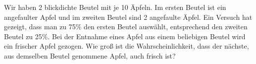 \documentclass{abgabe}
\begin{document}
\begin{questions}
    \question
    Wir  haben 2 blickdichte  Beutel  mit  je 10 Äpfeln.  
    Im  ersten  Beutel  ist  ein  angefaulter Apfel und im zweiten Beutel sind 2 angefaulte Äpfel. 
    Ein Versuch hat gezeigt, dass man zu 75\% den  ersten  Beutel  auswählt,  entsprechend  den  zweiten  Beutel  zu 25\%.  
    Bei  der Entnahme eines Apfel aus einem beliebigen Beutel wird ein frischer Apfel gezogen. 
    Wie groß  ist  die  Wahrscheinlichkeit,  dass  der  nächste,  aus  demselben  Beutel  genommene Apfel, auch frisch ist?
    \begin{solution}

    \end{solution}
\end{questions}
\end{document}

